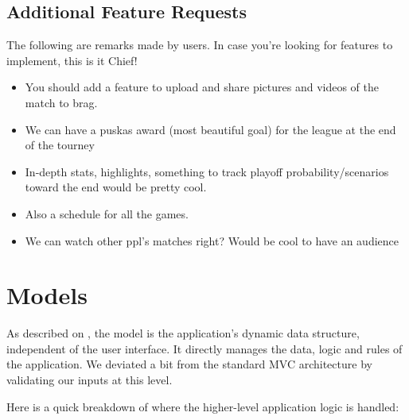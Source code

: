 \documentclass[letterpaper,10pt,english]{sphinxmanual}
\begin{document}
\section{Additional Feature Requests}
\label{\detokenize{readme:additional-feature-requests}}\label{\detokenize{readme:id6}}
The following are remarks made by users. In case you’re looking for features to
implement, this is it Chief!
\begin{itemize}
\item {} 
You should add a feature to upload and share pictures and videos of the
match to brag.

\item {} 
We can have a puskas award (most beautiful goal) for the league at the end of
the tourney

\item {} 
In-depth stats, highlights, something to track playoff probability/scenarios
toward the end would be pretty cool.

\item {} 
Also a schedule for all the games.

\item {} 
We can watch other ppl’s matches right? Would be cool to have an audience

\end{itemize}


\chapter{Models}
\label{\detokenize{tiger_leagues/models/readme:models}}\label{\detokenize{tiger_leagues/models/readme:tiger-leagues-models}}\label{\detokenize{tiger_leagues/models/readme::doc}}
As described on ,
the model is the application’s dynamic data structure, independent of the user
interface. It directly manages the data, logic and rules of the application.
We deviated a bit from the standard MVC architecture by validating our inputs
at this level.

Here is a quick breakdown of where the higher-level application logic is handled:
\end{document}
